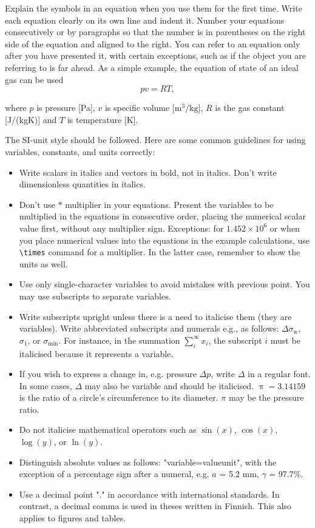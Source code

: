 Explain the symbols in an equation when you use them for the first time. Write each equation clearly on its own line and indent it. Number your equations consecutively or by paragraphs so that the number is in parentheses on the right side of the equation and aligned to the right. You can refer to an equation only after you have presented it, with certain exceptions, such as if the object you are referring to is far ahead. As a simple example, the equation of state of an ideal gas can be used
\begin{equation}
    pv=RT,
\end{equation}

where $p$ is pressure [Pa], $v$ is specific volume [$\mathrm{m^3/kg}$], $R$ is the gas constant [J/(kgK)] and $T$ is temperature [K].

The SI-unit style should be followed. Here are some common guidelines for using variables, constants, and units correctly:
\begin{itemize}
    \item Write scalars in italics and vectors in bold, not in italics. Don’t write dimensionless quantities in italics.
    \item Don't use $*$ multiplier in your equations. Present the variables to be multiplied in the equations in consecutive order, placing the numerical scalar value first, without any multiplier sign. Exceptions: for $1.452\times10^6$ or when you place numerical values into the equations in the example calculations, use \verb|\times| command for a multiplier. In the latter case, remember to show the units as well.
    \item Use only single-character variables to avoid mistakes with previous point. You may use subscripts to separate variables.
    \item Write subscripts upright unless there is a need to italicise them (they are variables). Write abbreviated subscripts and numerals e.g., as follows: $\Delta\sigma_{\mathrm{w}}$, $\sigma_1$, or $\sigma_\mathrm{min}$. For instance, in the summation $\sum_i^\infty x_i$, the subscript $i$ must be italicised because it represents a variable.
    \item If you wish to express a change in, e.g. pressure $\Delta p$, write $\Delta$ in a regular font. In some cases, $\varDelta$ may also be variable and should be italicised. $\uppi = 3.14159$ is the ratio of a circle’s circumference to its diameter. $\pi$ may be the pressure ratio.
    \item Do not italicise mathematical operators such as $\sin(x)$, $\cos(x)$, $\log(y)$, or $\ln(y)$.
    \item Distinguish absolute values as follows: "variable\textunderscore=\textunderscore value\textunderscore unit", with the exception of a percentage sign after a numeral, e.g. $a$ = 5.2 mm, $\gamma$ = 97.7\%.
    \item Use a decimal point "." in accordance with international standards. In contrast, a decimal comma is used in theses written in Finnish. This also applies to figures and tables.
\end{itemize}


